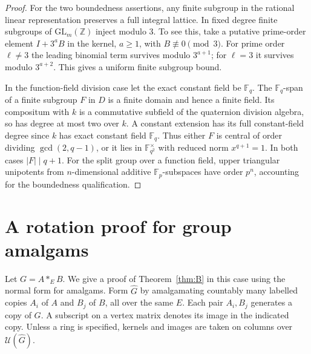 \documentclass[11pt,a4paper,reqno]{amsart}
\numberwithin{equation}{section}
\theoremstyle{remark}
\newcommand{\Z}{\mathbb Z}
\newcommand{\U}{\mathcal U}
\begin{document}
\begin{proof}
For the two boundedness assertions, any finite subgroup in the rational linear representation preserves a full integral lattice. In fixed degree finite subgroups of \(\mathrm{GL}_m(\Z)\) inject modulo \(3\). To see this, take a putative prime-order element \(I+3^a B\) in the kernel, \(a\ge1\), with \(B\not\equiv0\pmod3\). For prime order \(\ell\ne3\) the leading binomial term survives modulo \(3^{a+1}\); for \(\ell=3\) it survives modulo \(3^{a+2}\). This gives a uniform finite subgroup bound.

In the function-field division case let the exact constant field be \(\mathbb F_q\). The \(\mathbb F_q\)-span of a finite subgroup \(F\) in \(D\) is a finite domain and hence a finite field. Its compositum with \(k\) is a commutative subfield of the quaternion division algebra, so has degree at most two over \(k\). A constant extension has its full constant-field degree since \(k\) has exact constant field \(\mathbb F_q\). Thus either \(F\) is central of order dividing \(\gcd(2,q-1)\), or it lies in \(\mathbb F_{q^2}^\times\) with reduced norm \(x^{q+1}=1\). In both cases \(|F|\mid q+1\). For the split group over a function field, upper triangular unipotents from \(n\)-dimensional additive \(\mathbb F_p\)-subspaces have order \(p^n\), accounting for the boundedness qualification.
\end{proof}


\appendix
\section{A rotation proof for group amalgams}\label{sec:rotation}
Let \(G=A*_E B\). We give a proof of Theorem~\ref{thm:B} in this case using the normal form for amalgams. Form \(\widehat G\) by amalgamating countably many labelled copies \(A_i\) of \(A\) and \(B_j\) of \(B\), all over the same \(E\). Each pair \(A_i,B_j\) generates a copy of \(G\). A subscript on a vertex matrix denotes its image in the indicated copy. Unless a ring is specified, kernels and images are taken on columns over \(\U(\widehat G)\).
\end{document}

